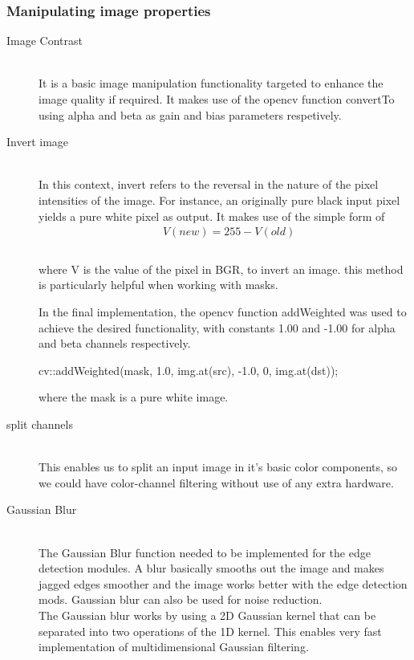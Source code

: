 \subsubsection{Manipulating image properties} 
\begin{description}
\item[Image Contrast]\hfill \\
It is a basic image manipulation functionality targeted to enhance the image quality if required.
It makes use of the opencv function convertTo using alpha and beta as gain and bias parameters respetively.

\item[Invert image]\hfill \\
In this context, invert refers to the reversal in the nature of the pixel intensities of the image.
For instance, an originally pure black input pixel yields a pure white pixel as output.
It makes use of the simple form of  
\begin{align*} &V(new) = 255 - V(old) \\ 
\end{align*} 
\\where V is the value of the pixel in BGR, to invert an image. 
this method is particularly helpful when working with masks.

In the final implementation, the opencv function addWeighted was used to achieve the desired functionality, with constants 1.00 and -1.00 for alpha and beta channels respectively.

cv::addWeighted(mask, 1.0, img.at(src), -1.0, 0, img.at(dst));

where the mask is a pure white image.

\item[split channels]\hfill \\
This enables us to split an input image in it's basic color components, so we could have color-channel filtering without use of any extra hardware.

\item[Gaussian Blur]\hfill \\
The Gaussian Blur function \cite{web:gaussianBlur}  needed to be implemented for the edge detection modules. A blur basically smooths out the image and makes jagged edges smoother and the image works better with the edge detection mods. Gaussian blur can also be used for noise reduction.
\\The Gaussian blur works by using a 2D Gaussian kernel that can be separated into two operations of the 1D kernel. This enables very fast implementation of multidimensional Gaussian filtering.  


\end{description}
